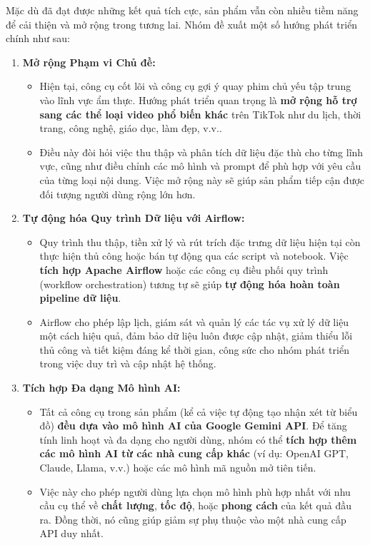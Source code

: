 Mặc dù đã đạt được những kết quả tích cực, sản phẩm vẫn còn nhiều tiềm năng để cải thiện và mở rộng trong tương lai. Nhóm đề xuất một số hướng phát triển chính như sau:
\begin{enumerate}
    \item \textbf{Mở rộng Phạm vi Chủ đề:}
    \begin{itemize}
        \item Hiện tại, công cụ cốt lõi và công cụ gợi ý quay phim chủ yếu tập trung vào lĩnh vực ẩm thực. Hướng phát triển quan trọng là \textbf{mở rộng hỗ trợ sang các thể loại video phổ biến khác} trên TikTok như du lịch, thời trang, công nghệ, giáo dục, làm đẹp, v.v..

        \item Điều này đòi hỏi việc thu thập và phân tích dữ liệu đặc thù cho từng lĩnh vực, cũng như điều chỉnh các mô hình và prompt để phù hợp với yêu cầu của từng loại nội dung. Việc mở rộng này sẽ giúp sản phẩm tiếp cận được đối tượng người dùng rộng lớn hơn.
    \end{itemize}

    \item \textbf{Tự động hóa Quy trình Dữ liệu với Airflow:}
    \begin{itemize}
        \item Quy trình thu thập, tiền xử lý và rút trích đặc trưng dữ liệu hiện tại còn thực hiện thủ công hoặc bán tự động qua các script và notebook. Việc \textbf{tích hợp Apache Airflow} hoặc các công cụ điều phối quy trình (workflow orchestration) tương tự sẽ giúp \textbf{tự động hóa hoàn toàn pipeline dữ liệu}.

        \item Airflow cho phép lập lịch, giám sát và quản lý các tác vụ xử lý dữ liệu một cách hiệu quả, đảm bảo dữ liệu luôn được cập nhật, giảm thiểu lỗi thủ công và tiết kiệm đáng kể thời gian, công sức cho nhóm phát triển trong việc duy trì và cập nhật hệ thống.
    \end{itemize}

    \item \textbf{Tích hợp Đa dạng Mô hình AI:}
    \begin{itemize}
        \item Tất cả công cụ trong sản phẩm (kể cả việc tự động tạo nhận xét từ biểu đồ) \textbf{đều dựa vào mô hình AI của Google Gemini API}. Để tăng tính linh hoạt và đa dạng cho người dùng, nhóm có thể \textbf{tích hợp thêm các mô hình AI từ các nhà cung cấp khác} (ví dụ: OpenAI GPT, Claude, Llama, v.v.) hoặc các mô hình mã nguồn mở tiên tiến.

        \item Việc này cho phép người dùng lựa chọn mô hình phù hợp nhất với nhu cầu cụ thể về \textbf{chất lượng}, \textbf{tốc độ}, hoặc \textbf{phong cách} của kết quả đầu ra. Đồng thời, nó cũng giúp giảm sự phụ thuộc vào một nhà cung cấp API duy nhất.
    \end{itemize}
\end{enumerate}

